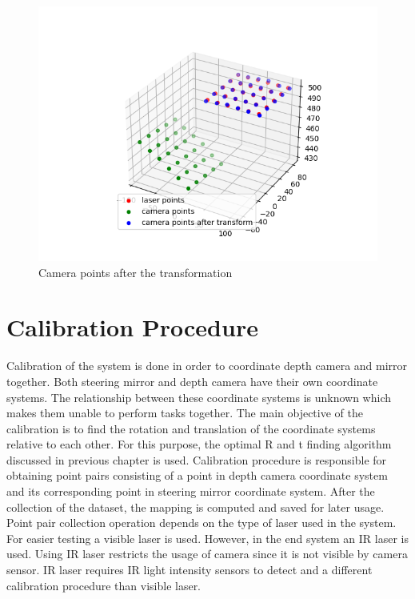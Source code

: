 \begin{figure}[!htb]\centering
    \includegraphics*[width = 16cm]{bilder/project/mapping2.png}
    \caption{Camera points after the transformation }
    \label{fig:mapping2}
\end{figure}


\section{Calibration Procedure}
\label{sec:Calibration Procedure}


Calibration of the system is done in order to coordinate depth
camera and mirror together. Both steering mirror and depth
camera have their own coordinate systems. The relationship
between these coordinate systems is unknown which makes them
unable to perform tasks together. The main objective of the
calibration is to find the rotation and translation of the
coordinate systems relative to each other.  For this purpose,
the optimal R and t finding algorithm discussed in previous
chapter is used.
Calibration procedure is responsible for obtaining point pairs
consisting of a point in depth camera coordinate system and its
corresponding point in steering mirror coordinate system. After
the collection of the dataset, the mapping is computed and saved
for later usage. Point pair collection operation depends on the
type of laser used in the system. For easier testing a visible
laser is used. However, in the end system an IR laser is used.
Using IR laser restricts the usage of camera since it is not
visible by camera sensor. IR laser requires IR light intensity
sensors to detect and a different calibration procedure than
visible laser.


